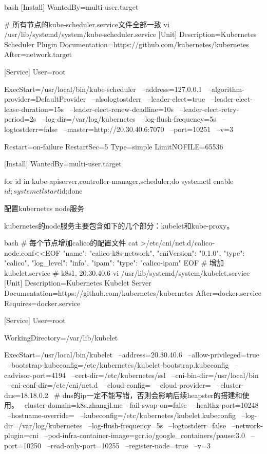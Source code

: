 \begin{outline}[enumerate]
\begin{code-in-enumerate}{bash}
[Install]
WantedBy=multi-user.target

# 所有节点的kube-scheduler.service文件全部一致
vi /usr/lib/systemd/system/kube-scheduler.service
[Unit]
Description=Kubernetes Scheduler Plugin
Documentation=https://github.com/kubernetes/kubernetes
After=network.target

[Service]
User=root

ExecStart=/usr/local/bin/kube-scheduler \
    --address=127.0.0.1 \
    --algorithm-provider=DefaultProvider \
    --alsologtostderr \
    --leader-elect=true \
    --leader-elect-lease-duration=15s \
    --leader-elect-renew-deadline=10s \
    --leader-elect-retry-period=2s \
    --log-dir=/var/log/kubernetes \
    --log-flush-frequency=5s \
    --logtostderr=false \
    --master=http://20.30.40.6:7070 \
    --port=10251 \
    --v=3

Restart=on-failure
RestartSec=5
Type=simple
LimitNOFILE=65536

[Install]
WantedBy=multi-user.target

for id in kube-{apiserver,controller-manager,scheduler};do systemctl enable $id;systemctl start $id;done
\end{code-in-enumerate}

  \1 配置kubernetes node服务

kubernetes的node服务主要包含如下的几个部分：kubelet和kube-proxy。
\begin{code-in-enumerate}{bash}
# 每个节点增加calico的配置文件
cat >/etc/cni/net.d/calico-node.conf<<EOF
{
    "name": "calico-k8s-network",
    "cniVersion": "0.1.0",
    "type": "calico",
    "log_level": "info",
    "ipam": {
        "type": "calico-ipam"
    }
}
EOF
# 增加kubelet.service
# k8s1, 20.30.40.6
vi /usr/lib/systemd/system/kubelet.service
[Unit]
Description=Kubernetes Kubelet Server
Documentation=https://github.com/kubernetes/kubernetes
After=docker.service
Requires=docker.service

[Service]
User=root

WorkingDirectory=/var/lib/kubelet

ExecStart=/usr/local/bin/kubelet \
    --address=20.30.40.6 \
    --allow-privileged=true \
    --bootstrap-kubeconfig=/etc/kubernetes/kubelet-bootstrap.kubeconfig \
    --cadvisor-port=4194 \
    --cert-dir=/etc/kubernetes/ssl \
    --cni-bin-dir=/usr/local/bin \
    --cni-conf-dir=/etc/cni/net.d \
    --cloud-config= \
    --cloud-provider= \
    --cluster-dns=18.18.0.2 \         # dns的ip一定不能写错，否则会影响后续heapster的搭建和使用。
    --cluster-domain=k8s.zhangjl.me\
    --fail-swap-on=false \
    --healthz-port=10248 \
    --hostname-override= \
    --kubeconfig=/etc/kubernetes/kubelet.kubeconfig \
    --log-dir=/var/log/kubernetes \
    --log-flush-frequency=5s \
    --logtostderr=false \
    --network-plugin=cni \
    --pod-infra-container-image=gcr.io/google_containers/pause:3.0 \
    --port=10250 \
    --read-only-port=10255 \
    --register-node=true \
    --v=3


\end{code-in-enumerate}
\end{outline}
